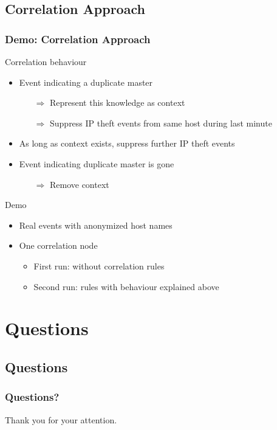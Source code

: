 \documentclass[10pt]{beamer}
\begin{document}
\subsection{Correlation Approach}

\begin{frame}
	\frametitle{Demo: Correlation Approach}
	\begin{block}{Correlation behaviour}
		\begin{itemize}
			\item Event indicating a duplicate master
				\begin{itemize}
					\item[$\Rightarrow$] Represent this knowledge as context
					\item[$\Rightarrow$] Suppress IP theft events from same
						host during last minute
				\end{itemize}
			\item As long as context exists, suppress further IP theft events
			\item Event indicating duplicate master is gone
				\begin{itemize}
					\item[$\Rightarrow$] Remove context
				\end{itemize}
		\end{itemize}
	\end{block}
	\begin{block}{Demo}
		\begin{itemize}
			\item Real events with anonymized host names
			\item One correlation node
				\begin{itemize}
					\item First run: without correlation rules 
					\item Second run: rules with behaviour explained above
				\end{itemize}
		\end{itemize}
	\end{block}
\end{frame}

\section*{Questions}
\subsection*{Questions}
\begin{frame}
	\frametitle{Questions?}
	\begin{center}	
		Thank you for your attention.
	\end{center}
\end{frame}
\end{document}

